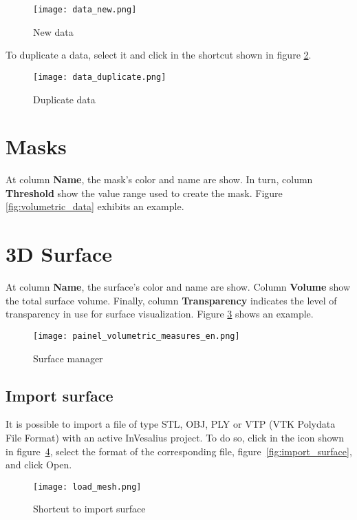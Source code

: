 \begin{figure}[!htb]
\centering
\texttt{[image: data\_new.png]}
\caption{New data}
\label{fig:new_data}
\end{figure}

To duplicate a data, select it and click in the shortcut shown in figure \ref{fig:duplicate_data}.

\begin{figure}[!htb]
\centering
\texttt{[image: data\_duplicate.png]}
\caption{Duplicate data}
\label{fig:duplicate_data}
\end{figure}


\newpage


\section{Masks}

At column \textbf{Name}, the mask's color and name are show. In turn, column \textbf{Threshold} show the value range
used to create the mask. Figure \ref{fig:volumetric_data} exhibits an example.

\section{3D Surface}

At column \textbf{Name}, the surface's color and name are show. Column \textbf{Volume} show the total surface volume.
Finally, column \textbf{Transparency} indicates the level of transparency in use for surface visualization.
Figure \ref{fig:surface_manager} shows an example.

\begin{figure}[!htb]
\centering
\texttt{[image: painel\_volumetric\_measures\_en.png]}
\caption{Surface manager}
\label{fig:surface_manager}
\end{figure}

\subsection{Import surface}

It is possible to import a file of type STL, OBJ, PLY or VTP (VTK Polydata File Format) with an active InVesalius
project. To do so, click in the icon shown in figure~\ref{fig:import_stl}, select the
format of the corresponding file, figure~\ref{fig:import_surface}, and click Open.

\begin{figure}[!htb]
\centering
\texttt{[image: load\_mesh.png]}
\caption{Shortcut to import surface }
\label{fig:import_stl}
\end{figure}

